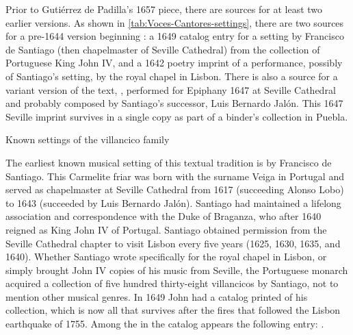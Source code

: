 Prior to Gutiérrez de Padilla's 1657 piece, there are sources for at least two
earlier versions. 
As shown in \cref{tab:Voces-Cantores-settings}, there are two sources for a
pre-1644 version beginning : a 1649 catalog
entry for a setting by Francisco de Santiago (then chapelmaster of Seville
Cathedral) from the collection of Portuguese King John IV, and a 1642 poetry
imprint of a performance, possibly of Santiago's setting, by the royal chapel in
Lisbon.
There is also a source for a variant version of the text, , performed for Epiphany 1647 at Seville Cathedral and probably composed
by Santiago's successor, Luis Bernardo Jalón.
This 1647 Seville imprint survives in a single copy as part of a binder's
collection in Puebla.

{Known settings of the  villancico family}

The earliest known musical setting of this textual tradition is by Francisco de
Santiago.
This Carmelite friar was born with the surname Veiga in Portugal and served as
chapelmaster at Seville Cathedral from 1617 (succeeding Alonso Lobo) to 1643
(succeeded by Luis Bernardo Jalón).%
    \Autocites{Stevenson:SantiagoF}{Perez:DMEH-Santiago} 
Santiago had maintained a lifelong association and correspondence with the Duke
of Braganza, who after 1640 reigned as King John IV of Portugal.
Santiago obtained permission from the Seville Cathedral chapter to visit Lisbon
every five years (1625, 1630, 1635, and 1640).
Whether Santiago wrote specifically for the royal chapel in Lisbon, or simply
brought John IV copies of his music from Seville, the Portuguese monarch
acquired a collection of five hundred thirty-eight villancicos by Santiago, not
to mention other musical genres.
In 1649 John had a catalog printed of his collection, which is now all that
survives after the fires that followed the Lisbon earthquake of 1755.
Among the  in the
catalog appears the following entry:
.%
    \Autocites
    [caixão 26, ]{JohnIV:Catalog}
    [see also][]{Ribeiro:JohnIV}

